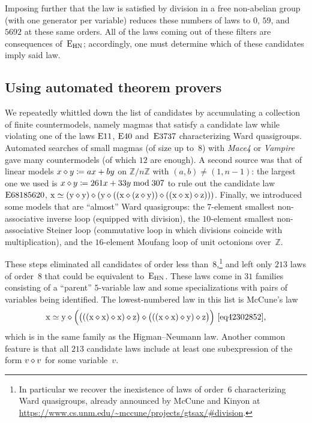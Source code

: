 Imposing further that the law is satisfied by division in a free non-abelian group (with one generator per variable) reduces these numbers of laws to $0$, $59$, and $\num{5692}$ at these same orders.  All of the laws coming out of these filters are consequences of~$\mathrm{E}_{\mathrm{HN}}$; accordingly, one must determine which of these candidates imply said law.

\subsection{Using automated theorem provers}

We repeatedly whittled down the list of candidates by accumulating a collection of finite countermodels, namely magmas that satisfy a candidate law while violating one of the laws $\mathrm{E}11$, $\mathrm{E}40$ and~$\mathrm{E}3737$ characterizing Ward quasigroups.  Automated searches of small magmas (of size up to~$8$) with \emph{Mace4} or \emph{Vampire} gave many countermodels (of which $12$ are enough).  A second source was that of linear models $x \diamond y \coloneqq ax+by$ on $\mathbb{Z}/n\mathbb{Z}$ with $(a,b)\neq(1,n-1)$: the largest one we used is $x \diamond y \coloneqq 261x + 33y \bmod 307$ to rule out the candidate law $\mathrm{E}68185620$, $\mathrm{x} \simeq (\mathrm{y} \diamond \mathrm{y}) \diamond (\mathrm{y} \diamond ((\mathrm{x} \diamond (\mathrm{z} \diamond \mathrm{y})) \diamond ((\mathrm{x} \diamond \mathrm{x}) \diamond \mathrm{z})))$.  Finally, we introduced some models that are ``almost'' Ward quasigroups: the $7$-element smallest non-associative inverse loop (equipped with division), the $10$-element smallest non-associative Steiner loop (commutative loop in which divisions coincide with multiplication), and the $16$-element Moufang loop of unit octonions over~$\mathbb{Z}$.

These steps eliminated all candidates of order less than~$8$,\footnote{In particular we recover the inexistence of laws of order~$6$ characterizing Ward quasigroups, already announced by McCune and Kinyon at \url{https://www.cs.unm.edu/~mccune/projects/gtsax/\#division}.} and left only $213$ laws of order~$8$ that could be equivalent to~$\mathrm{E}_{\mathrm{HN}}$.  These laws come in $31$ families consisting of a ``parent'' $5$-variable law and some specializations with pairs of variables being identified.  The lowest-numbered law in this list is McCune's law
\[
\x \formaleq \y \op \Bigl(\bigl(((\x \op \x) \op \x) \op \z\bigr) \op \bigl(((\x \op \x) \op \y) \op \z\bigr)\Bigr) \ \eqref{eq42302852},
\]
which is in the same family as the Higman--Neumann law.  Another common feature is that all $213$ candidate laws include at least one subexpression of the form $v \diamond v$ for some variable~$v$.


